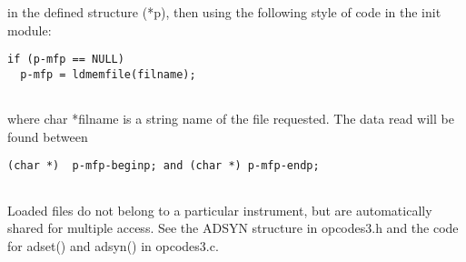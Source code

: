  


  in the defined structure (*p), then using the following style of code in the init module: 


 
\begin{lstlisting}
if (p-mfp == NULL)
  p-mfp = ldmemfile(filname);
        
\end{lstlisting}


 


  where char *filname is a string name of the file requested. The data read will be found between 


 
\begin{lstlisting}
(char *)  p-mfp-beginp; and (char *) p-mfp-endp;
        
\end{lstlisting}


 


  Loaded files do not belong to a particular instrument, but are automatically shared for multiple access. See the ADSYN structure in opcodes3.h and the code for adset() and adsyn() in opcodes3.c. 


\begin{comment}
\begin{tabular}{lcr}
Previous &Home &Next \\
File Sharing &Up &Pitch Conversion

\end{tabular}



\end{comment}
